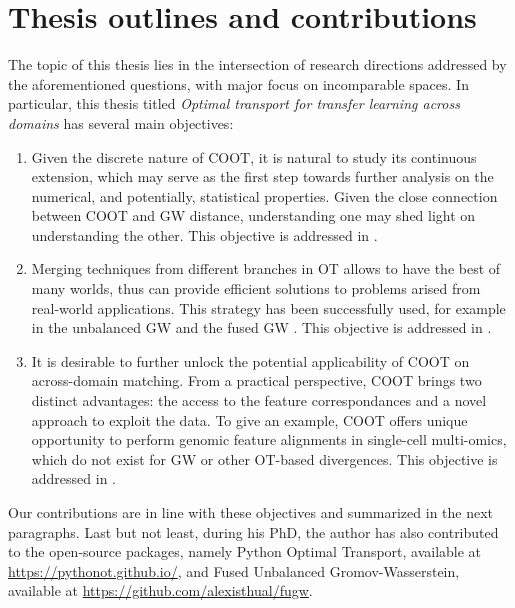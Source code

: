 \section{Thesis outlines and contributions}

The topic of this thesis lies in the intersection of research directions addressed
by the aforementioned questions, with major focus on incomparable spaces.
In particular, this thesis titled
\textit{Optimal transport for transfer learning across domains} has several main objectives:
\begin{enumerate}
    \item Given the discrete nature of COOT, it is natural to study
    its continuous extension, which may serve as the first step towards further analysis
    on the numerical, and potentially, statistical properties. Given the close connection between
    COOT and GW distance, understanding one may shed light on understanding the other.
    This objective is addressed in .

    \item Merging techniques from different branches in OT allows to have the best of many worlds,
    thus can provide efficient solutions to problems arised from real-world applications.
    This strategy has been successfully used,
    for example in the unbalanced GW \citep{Sejourne20} and the fused GW \citep{Vayer19b}.
    This objective is addressed in .

    \item It is desirable to further unlock the potential applicability of COOT
    on across-domain matching. From a practical perspective, COOT brings two distinct advantages:
    the access to the feature correspondances and a novel approach to exploit the data.
    To give an example, COOT offers unique opportunity to perform genomic feature alignments
    in single-cell multi-omics, which do not exist for GW or other OT-based divergences.
    This objective is addressed in .
\end{enumerate}
Our contributions are in line with these objectives and summarized in the next paragraphs.
Last but not least, during his PhD, the author has also contributed to the open-source packages,
namely Python Optimal Transport, available at \url{https://pythonot.github.io/}, and
Fused Unbalanced Gromov-Wasserstein, available at \url{https://github.com/alexisthual/fugw}.

